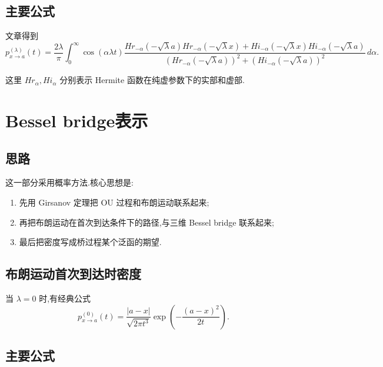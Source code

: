 \documentclass[oneside]{ctexart}
\begin{document}
\subsection{主要公式}

文章得到
\begin{equation}\label{eq:integral}
    p_{x\to a}^{(\lambda)}(t)
    =
    \frac{2\lambda}{\pi}
    \int_0^\infty
    \cos(\alpha\lambda t)
    \frac{
        Hr_{-\alpha}(-\sqrt{\lambda}a)Hr_{-\alpha}(-\sqrt{\lambda}x)
        +
        Hi_{-\alpha}(-\sqrt{\lambda}x)Hi_{-\alpha}(-\sqrt{\lambda}a)
    }{
        \left(Hr_{-\alpha}(-\sqrt{\lambda}a)\right)^2
        +
        \left(Hi_{-\alpha}(-\sqrt{\lambda}a)\right)^2
    }\,d\alpha.
\end{equation}

这里 $Hr_\alpha,Hi_\alpha$ 分别表示 Hermite 函数在纯虚参数下的实部和虚部.

\section{Bessel bridge表示}

\subsection{思路}

这一部分采用概率方法.核心思想是:

\begin{enumerate}[(1)]
    \item 先用 Girsanov 定理把 OU 过程和布朗运动联系起来;
    \item 再把布朗运动在首次到达条件下的路径,与三维 Bessel bridge 联系起来;
    \item 最后把密度写成桥过程某个泛函的期望.
\end{enumerate}

\subsection{布朗运动首次到达时密度}

当 $\lambda=0$ 时,有经典公式
\begin{equation}\label{eq:bm}
    p_{x\to a}^{(0)}(t)
    =
    \frac{|a-x|}{\sqrt{2\pi t^3}}
    \exp\left(-\frac{(a-x)^2}{2t}\right).
\end{equation}

\subsection{主要公式}
\end{document}
